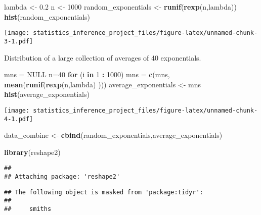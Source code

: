 \documentclass[]{article}
\newenvironment{Shaded}{\begin{snugshade}}{\end{snugshade}}
\newcommand{\KeywordTok}[1]{\textcolor[rgb]{0.13,0.29,0.53}{\textbf{#1}}}
\newcommand{\DecValTok}[1]{\textcolor[rgb]{0.00,0.00,0.81}{#1}}
\newcommand{\FloatTok}[1]{\textcolor[rgb]{0.00,0.00,0.81}{#1}}
\newcommand{\StringTok}[1]{\textcolor[rgb]{0.31,0.60,0.02}{#1}}
\newcommand{\OtherTok}[1]{\textcolor[rgb]{0.56,0.35,0.01}{#1}}
\newcommand{\ControlFlowTok}[1]{\textcolor[rgb]{0.13,0.29,0.53}{\textbf{#1}}}
\newcommand{\OperatorTok}[1]{\textcolor[rgb]{0.81,0.36,0.00}{\textbf{#1}}}
\newcommand{\NormalTok}[1]{#1}
\begin{document}
\begin{Shaded}
\begin{Highlighting}[]
\NormalTok{lambda <-}\StringTok{ }\FloatTok{0.2}
\NormalTok{n <-}\StringTok{ }\DecValTok{1000}
\NormalTok{random_exponentials <-}\StringTok{ }\KeywordTok{runif}\NormalTok{(}\KeywordTok{rexp}\NormalTok{(n,lambda))}
\KeywordTok{hist}\NormalTok{(random_exponentials)}
\end{Highlighting}
\end{Shaded}

\texttt{[image: statistics\_inference\_project\_files/figure-latex/unnamed-chunk-3-1.pdf]}

Distribution of a large collection of averages of 40 exponentials.

\begin{Shaded}
\begin{Highlighting}[]
\NormalTok{mns =}\StringTok{ }\OtherTok{NULL}
\NormalTok{n=}\DecValTok{40}
\ControlFlowTok{for}\NormalTok{ (i }\ControlFlowTok{in} \DecValTok{1} \OperatorTok{:}\StringTok{ }\DecValTok{1000}\NormalTok{) mns =}\StringTok{ }\KeywordTok{c}\NormalTok{(mns, }\KeywordTok{mean}\NormalTok{(}\KeywordTok{runif}\NormalTok{(}\KeywordTok{rexp}\NormalTok{(n,lambda) )))}
\NormalTok{average_exponentials <-}\StringTok{ }\NormalTok{mns}
\KeywordTok{hist}\NormalTok{(average_exponentials)}
\end{Highlighting}
\end{Shaded}

\texttt{[image: statistics\_inference\_project\_files/figure-latex/unnamed-chunk-4-1.pdf]}

\begin{Shaded}
\begin{Highlighting}[]
\NormalTok{data_combine <-}\StringTok{ }\KeywordTok{cbind}\NormalTok{(random_exponentials,average_exponentials)}
\end{Highlighting}
\end{Shaded}

\begin{Shaded}
\begin{Highlighting}[]
\KeywordTok{library}\NormalTok{(reshape2)}
\end{Highlighting}
\end{Shaded}

\begin{verbatim}
## 
## Attaching package: 'reshape2'
\end{verbatim}

\begin{verbatim}
## The following object is masked from 'package:tidyr':
## 
##     smiths
\end{verbatim}
\end{document}
